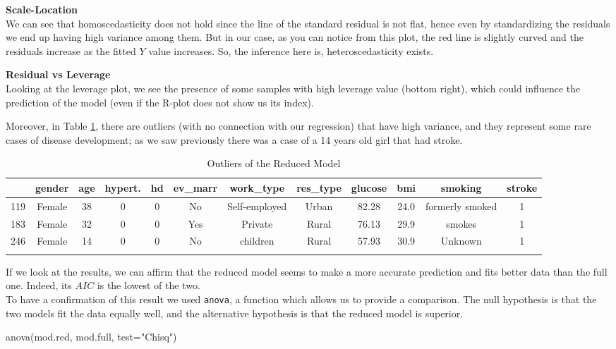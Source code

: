 \documentclass[
]{article}
\newenvironment{Shaded}{\begin{snugshade}}{\end{snugshade}}
\newcommand{\AttributeTok}[1]{\textcolor[rgb]{0.77,0.63,0.00}{#1}}
\newcommand{\FunctionTok}[1]{\textcolor[rgb]{0.00,0.00,0.00}{#1}}
\newcommand{\NormalTok}[1]{#1}
\newcommand{\StringTok}[1]{\textcolor[rgb]{0.31,0.60,0.02}{#1}}
\begin{document}
\textbf{Scale-Location}\\
We can see that homoscedasticity does not hold since the line of the
standard residual is not flat, hence even by standardizing the residuals
we end up having high variance among them. But in our case, as you can
notice from this plot, the red line is slightly curved and the residuals
increase as the fitted \(Y\) value increases. So, the inference here
is, heteroscedasticity exists.

\textbf{Residual vs Leverage}\\
Looking at the leverage plot, we see the presence of some samples with
high leverage value (bottom right), which could influence the prediction
of the model (even if the R-plot does not show us its index).

Moreover, in Table \ref{outliers_reduced}, there are outliers (with no connection with our regression) that have high variance, and they represent some rare cases of disease development; as we saw previously there was a case
of a 14 years old girl that had stroke.


\begin{longtable}[]{@{}lccccccccccc@{}}
\toprule
& gender & age & hypert. & hd & ev\_marr & work\_type & res\_type &
glucose & bmi & smoking & stroke \\
\midrule
\endhead
119 & Female & 38 & 0 & 0 & No & Self-employed & Urban & 82.28 & 24.0 &
formerly smoked & 1 \\
183 & Female & 32 & 0 & 0 & Yes & Private & Rural & 76.13 & 29.9 &
smokes & 1 \\
246 & Female & 14 & 0 & 0 & No & children & Rural & 57.93 & 30.9 &
Unknown & 1 \\
\bottomrule
\caption{Outliers of the Reduced Model}\label{outliers_reduced}
\end{longtable}
If we look at the results, we can affirm that the reduced model seems to make a more accurate prediction and fits better data than the full one. Indeed, its \(AIC\)
is the lowest of the two.\\
To have a confirmation of this result we used \texttt{anova}, a function
which allows us to provide a comparison. The null hypothesis is that the
two models fit the data equally well, and the alternative hypothesis is
that the reduced model is superior.

\begin{Shaded}
\begin{Highlighting}[]
\FunctionTok{anova}\NormalTok{(mod.red, mod.full, }\AttributeTok{test=}\StringTok{"Chisq"}\NormalTok{)}
\end{Highlighting}
\end{Shaded}
\end{document}
